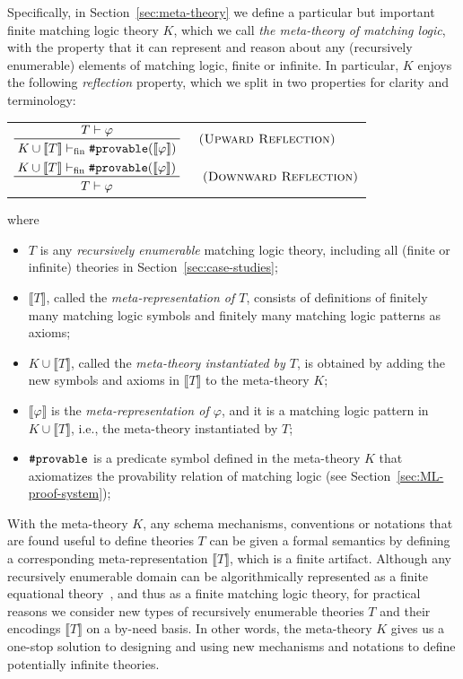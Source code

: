 \documentclass[UTF8,11pt]{article}
\theoremstyle{plain}
\theoremstyle{definition}
\theoremstyle{remark}
\newcommand{\vdashfin}{\vdash_\text{fin}}
\newcommand{\denote}[1]{\llbracket{#1}\rrbracket}
\newcommand{\sharpsymbol}{\#}
\newcommand{\Kdeduce}{\textup{\texttt{\sharpsymbol provable}}}
\begin{document}
Specifically, in Section~\ref{sec:meta-theory} we define a particular but
important finite matching logic theory $K$, which we call
\emph{the meta-theory of matching logic}, with the property that it can
represent and reason about any (recursively enumerable) elements of
matching logic, finite or infinite.
In particular, $K$ enjoys the following \emph{reflection} property, which we
split in two properties for clarity and terminology:
\begin{center}
	\begin{tabular}{l}
		$
		\prftree[r]{\hspace*{3ex}\textsc{(Upward Reflection)}}
		{T \vdash \varphi}
		{K \cup \denote{T} \vdashfin \Kdeduce(\denote{\varphi})}
		$
		\\[4ex]
		$
		\prftree[r]{\hspace*{3ex} \textsc{(Downward Reflection)}}
		{K \cup \denote{T} \vdashfin \Kdeduce(\denote{\varphi})}
		{T \vdash \varphi}
		$
	\end{tabular}
\end{center}
where 
\begin{itemize}
	\item $T$ is any \emph{recursively enumerable} matching logic theory,
	including all (finite or infinite) theories in
	Section~\ref{sec:case-studies};
	\item $\denote{T}$, called the \emph{meta-representation of $T$}, consists 
	of definitions of finitely many matching logic symbols and finitely many 
	matching logic patterns as axioms;
	\item $K \cup \denote{T}$, called the \emph{meta-theory instantiated by 
	$T$}, is obtained by adding the new symbols and axioms in 
	$\denote{T}$ to the meta-theory $K$;
	\item $\denote{\varphi}$ is the \emph{meta-representation of $\varphi$}, 
	and it is a matching logic pattern in $K \cup \denote{T}$, i.e., the 
	meta-theory instantiated by $T$;
	\item $\Kdeduce$ is a predicate symbol defined in the meta-theory $K$ that 
	axiomatizes the provability relation of matching logic (see 
	Section~\ref{sec:ML-proof-system});
\end{itemize}
	
With the meta-theory $K$, any schema mechanisms, conventions or notations
that are found useful to define theories $T$ can be given a formal semantics by 
defining a corresponding meta-representation $\denote{T}$, which is a finite
artifact.
Although any recursively enumerable domain can be algorithmically represented
as a finite equational theory~\cite{bt95}, and thus as a finite matching logic
theory, for practical reasons we consider new types of recursively
enumerable theories $T$ and their encodings $\denote{T}$ on a by-need basis.
In other words, the meta-theory $K$ gives us a one-stop solution to designing
and using new mechanisms and notations to define potentially infinite
theories.
\end{document}
